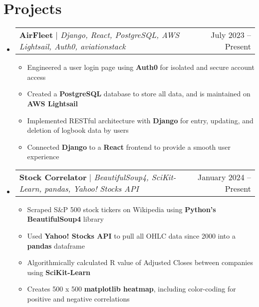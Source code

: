 \documentclass[letterpaper,11pt]{article}
\makeatletter
\newcommand{\resumeItem}[1]{
  \item\small{
    {#1 \vspace{-2pt}}
  }
}
\newcommand{\resumeProjectHeading}[2]{
    \item
    \begin{tabular*}{0.97\textwidth}{l@{\extracolsep{\fill}}r}
      \small#1 & #2 \\
    \end{tabular*}\vspace{-7pt}
}
\newcommand{\resumeSubHeadingListStart}{\begin{itemize}[leftmargin=0.15in, label={}]}
\newcommand{\resumeSubHeadingListEnd}{\end{itemize}}
\newcommand{\resumeItemListStart}{\begin{itemize}}
\newcommand{\resumeItemListEnd}{\end{itemize}\vspace{-7pt}}
\makeatother
\begin{document}
\section{Projects}
    \resumeSubHeadingListStart
      \resumeProjectHeading
          {\textbf{AirFleet} $|$ \emph{Django, React, PostgreSQL, AWS Lightsail, Auth0, aviationstack}}{July 2023 -- Present}
          \resumeItemListStart
            \resumeItem{Engineered a user login page using \textbf{Auth0} for isolated and secure account access}
            \resumeItem{Created a \textbf{PostgreSQL} database to store all data, and is maintained on \textbf{AWS Lightsail}}
            \resumeItem{Implemented RESTful architecture with \textbf{Django} for entry, updating, and deletion of logbook data by users}
            \resumeItem{Connected \textbf{Django} to a \textbf{React} frontend to provide a smooth user experience}
          \resumeItemListEnd
      \resumeProjectHeading
          {\textbf{Stock Correlator} $|$ \emph{BeautifulSoup4, SciKit-Learn, pandas, Yahoo! Stocks API}}{January 2024 -- Present}
          \resumeItemListStart
            \resumeItem{Scraped S\&P 500 stock tickers on Wikipedia using \textbf{Python's BeautifulSoup4} library}
            \resumeItem{Used \textbf{Yahoo! Stocks API} to pull all OHLC data since 2000 into a \textbf{pandas} dataframe}
            \resumeItem{Algorithmically calculated R value of Adjusted Closes between companies using \textbf{SciKit-Learn}}
            \resumeItem{Creates 500 x 500 \textbf{matplotlib heatmap}, including color-coding for positive and negative correlations}
          \resumeItemListEnd
    \resumeSubHeadingListEnd
%
\end{document}
